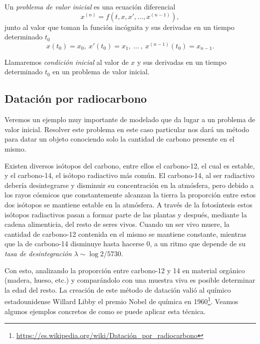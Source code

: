 \documentclass[../ecuaciones_diferenciales.tex]{subfiles}
\begin{document}
\begin{definition}
	Un \emph{problema de valor inicial} es una ecuación diferencial
	\[x^{(n)} = f(t, x, x', \dots, x^{(n - 1)}),\]
    junto al valor que toman la función incógnita y sus derivadas en un tiempo
    determinado \(t_0\)
	\[x(t_0) = x_0,\ x'(t_0) = x_1,\ \dots\ ,\ x^{(n - 1)}(t_0) = x_{n - 1}.\]
\end{definition}

\begin{definition}
    Llamaremos \emph{condición inicial} al valor de \(x\) y sus derivadas en un
    tiempo determinado \(t_0\) en un problema de valor inicial.
\end{definition}

\subsection{Datación por radiocarbono}

Veremos un ejemplo muy importante de modelado que da lugar a un problema de 
valor inicial. Resolver este problema en este caso particular nos dará un método
para datar un objeto conociendo solo la cantidad de carbono presente en el mismo.

Existen diversos isótopos del carbono, entre ellos el carbono-12, el cual es
estable, y el carbono-14, el isótopo radiactivo más común. El carbono-14, al ser
radiactivo debería desintegrarse y disminuir su concentración en la atmósfera,
pero debido a los rayos cósmicos que constantemente alcanzan la tierra la
proporción entre estos dos isótopos se mantiene estable en la atmósfera. A
través de la fotosíntesis estos isótopos radiactivos pasan a formar parte de las
plantas y después, mediante la cadena alimenticia, del resto de seres vivos.
Cuando un ser vivo muere, la cantidad de carbono-12 contenida en el mismo se
mantiene constante, mientras que la de carbono-14 disminuye hasta hacerse 0,
a un ritmo que depende de su \emph{tasa de desintegración}
\(\lambda \sim \log 2 / 5730\).

Con esto, analizando la proporción entre carbono-12 y 14 en
material orgánico (madera, hueso, etc.) y comparándolo con una muestra viva es 
posible determinar la edad del resto. La creación de este método de
datación valió al químico estadounidense Willard Libby el premio Nobel de
química en
1960\footnote{\url{https://es.wikipedia.org/wiki/Datación_por_radiocarbono}}.
Veamos algunos ejemplos concretos de como se puede aplicar esta
técnica.
\end{document}
